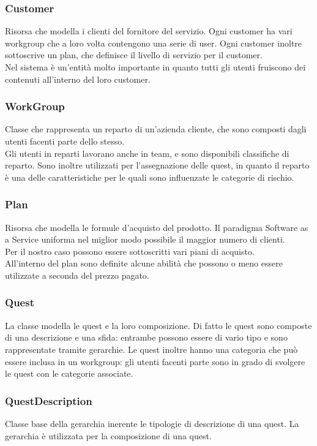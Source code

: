\subsubsection{Customer} Risorsa che modella i clienti del fornitore del servizio. Ogni customer ha vari workgroup che a loro volta contengono una serie di user. Ogni customer inoltre sottoscrive un plan, che definisce il livello di servizio per il customer.\\
Nel sistema è un'entità molto importante in quanto tutti gli utenti fruiscono dei contenuti all'interno del loro customer.\\
\subsubsection{WorkGroup} Classe che rappresenta un reparto di un'azienda cliente, che sono composti dagli utenti facenti parte dello stesso.\\
Gli utenti in reparti lavorano anche in team, e sono disponibili classifiche di reparto. Sono inoltre utilizzati per l'assegnazione delle quest, in quanto il reparto è una delle caratteristiche per le quali sono influenzate le categorie di rischio.
\subsubsection{Plan}Risorsa che modella le formule d'acquisto del prodotto. Il paradigma Software as a Service uniforma nel miglior modo possibile il maggior numero di clienti.\\
Per il nostro caso possono essere sottoscritti vari piani di acquisto.\\
All'interno del plan sono definite alcune abilità che possono o meno essere utilizzate a seconda del prezzo pagato.
\subsubsection{Quest} La classe modella le quest e la loro composizione. Di fatto le quest sono composte di una descrizione e una sfida: entrambe possono essere di vario tipo e sono rappresentate tramite gerarchie.
Le quest inoltre hanno una categoria che può essere inclusa in un workgroup: gli utenti facenti parte sono in grado di svolgere le quest con le categorie associate.
\subsubsection{QuestDescription}Classe base della gerarchia inerente le tipologie di descrizione di una quest. La gerarchia è utilizzata per la composizione di una quest.
